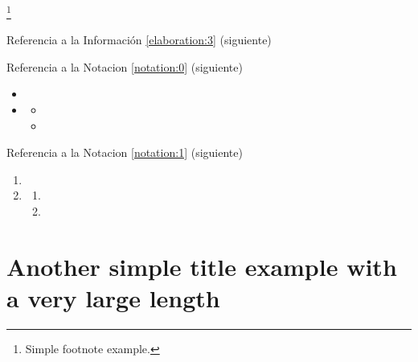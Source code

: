 \lipsum[1] %

\begin{attentionbox}
\label{attentionbox:a}
\lipsum[1][1-3]\footnote{Simple footnote example.}
\end{attentionbox}

\lipsum[1] %

Referencia a la Información \ref{elaboration:3} (siguiente)

\begin{elaboration}[Título C]
\label{elaboration:3}
\lipsum[1][1-3] 
\end{elaboration}

\lipsum[1][1-3] %


Referencia a la Notacion \ref{notation:0} (siguiente)

\begin{notation}[Título C]
\label{notation:0}
\lipsum[1][1-2]
\begin{itemize}
\item \lipsum[1][1-2]
\item \lipsum[1][1-2]
\begin{itemize}
\item \lipsum[1][1-2]
\item \lipsum[1][1-2]
\end{itemize}
\end{itemize}
\end{notation}

\lipsum[1][1-3] %

Referencia a la Notacion \ref{notation:1} (siguiente)

\begin{notation}[Título C]
\label{notation:1}
\lipsum[1][1-2]
\begin{enumerate}
\item \lipsum[1][1-2]
\item \lipsum[1][1-2]
\begin{enumerate}
\item \lipsum[1][1-2]
\item \lipsum[1][1-2]
\end{enumerate}
\end{enumerate}
\end{notation}

\section{Another simple title example with a very large length}

